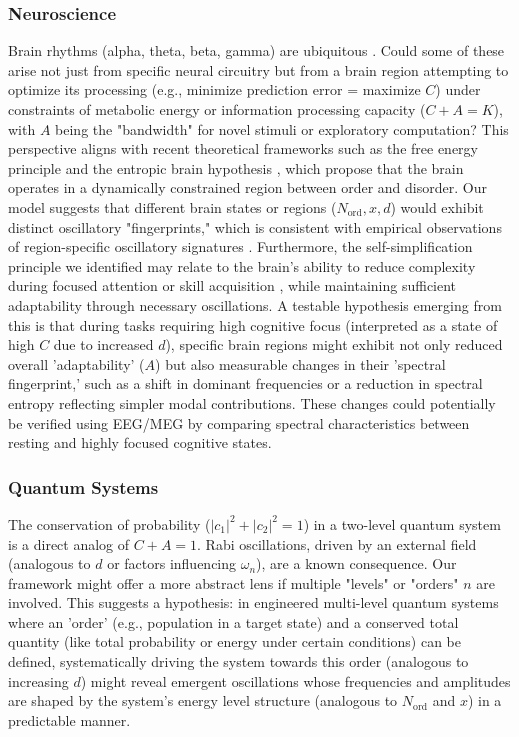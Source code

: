 \documentclass[11pt,a4paper]{article}
\begin{document}
\subsubsection{Neuroscience}
Brain rhythms (alpha, theta, beta, gamma) are ubiquitous \cite{Buzsaki2006}. Could some of these arise not just from specific neural circuitry but from a brain region attempting to optimize its processing (e.g., minimize prediction error = maximize $C$) under constraints of metabolic energy or information processing capacity ($C+A=K$), with $A$ being the "bandwidth" for novel stimuli or exploratory computation? This perspective aligns with recent theoretical frameworks such as the free energy principle \cite{Friston2010,Friston2019,Parr2020} and the entropic brain hypothesis \cite{Carhart-Harris2014,Carhart-Harris2018}, which propose that the brain operates in a dynamically constrained region between order and disorder. Our model suggests that different brain states or regions ($N_{\text{ord}}, x, d$) would exhibit distinct oscillatory "fingerprints," which is consistent with empirical observations of region-specific oscillatory signatures \cite{Buzsaki2006,Cocchi2017}. Furthermore, the self-simplification principle we identified may relate to the brain's ability to reduce complexity during focused attention or skill acquisition \cite{Marblestone2016}, while maintaining sufficient adaptability through necessary oscillations. A testable hypothesis emerging from this is that during tasks requiring high cognitive focus (interpreted as a state of high $C$ due to increased $d$), specific brain regions might exhibit not only reduced overall 'adaptability' ($A$) but also measurable changes in their 'spectral fingerprint,' such as a shift in dominant frequencies or a reduction in spectral entropy reflecting simpler modal contributions. These changes could potentially be verified using EEG/MEG by comparing spectral characteristics between resting and highly focused cognitive states.

\subsubsection{Quantum Systems}
The conservation of probability ($|c_1|^2 + |c_2|^2 = 1$) in a two-level quantum system is a direct analog of $C+A=1$. Rabi oscillations, driven by an external field (analogous to $d$ or factors influencing $\omega_n$), are a known consequence. Our framework might offer a more abstract lens if multiple "levels" or "orders" $n$ are involved. This suggests a hypothesis: in engineered multi-level quantum systems where an 'order' (e.g., population in a target state) and a conserved total quantity (like total probability or energy under certain conditions) can be defined, systematically driving the system towards this order (analogous to increasing $d$) might reveal emergent oscillations whose frequencies and amplitudes are shaped by the system's energy level structure (analogous to $N_{\text{ord}}$ and $x$) in a predictable manner.
\end{document}
